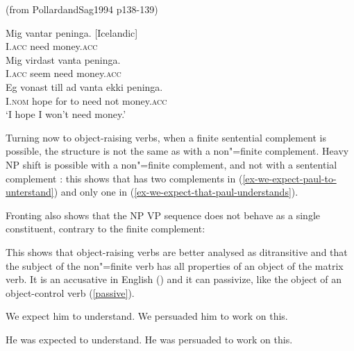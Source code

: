 \documentclass[output=paper
	        ,collection
	        ,collectionchapter
 	        ,biblatex
                ,babelshorthands
                ,newtxmath
                ,draftmode
                ,colorlinks, citecolor=brown
]{langscibook}
\begin{document}
\begin{exe}
\ex (from PollardandSag1994 p138-139)
\begin{xlist}
\ex \gll Mig vantar peninga. [Icelandic]\\
I.\textsc{acc} need money.\textsc{acc} \\
\ex \gll Mig virdast vanta peninga. \label{need} \\
I.\textsc{acc} seem need money.\textsc{acc} \\
\ex \gll Eg vonast till ad vanta ekki peninga. \label{hope-i} \\
I.\textsc{nom} hope for to need not money.\textsc{acc} \\
\glt `I hope I won't need money.'
	\end{xlist}
		
\end{exe}

Turning now to object-raising verbs, when a finite sentential complement is possible, the structure is not the same as  with a non"=finite complement. Heavy NP shift is possible with a non"=finite complement, and not with a sentential complement \citet{Bresnan1982} \citet{PollardandSag1994}: this shows that  has two complements in (\ref{ex-we-expect-paul-to-unterstand}) and only one in (\ref{ex-we-expect-that-paul-understands}).

\eal
{}
\zl

Fronting also shows that the NP VP sequence does not behave as a single constituent, contrary to the finite complement:

\eal
{}
\zl


This shows that object-raising verbs are better analysed as ditransitive and that the subject of the non"=finite verb has all properties of an object of the matrix verb. It is an accusative in English () and it can passivize, like the object of an object-control verb (\ref{passive}).

\begin{exe}
\ex
\begin{xlist}
\ex We expect him to understand.
\ex  We persuaded him to work on this.
\end{xlist}
\ex \begin{xlist} \label{passive}
\ex  He was expected to understand.
\ex  He was persuaded to work on this.
\end{xlist}
	
\end{exe}
\end{document}
